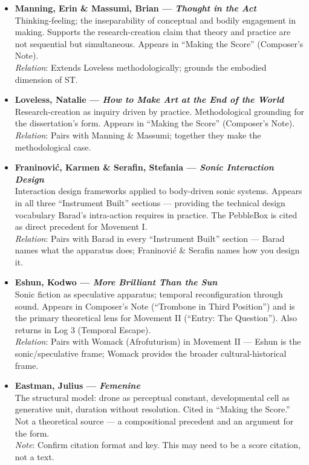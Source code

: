 \begin{itemize}

    \item \textbf{Manning, Erin \& Massumi, Brian — \textit{Thought in the Act}} \parencite{Manning_Massumi_2014}\\
    Thinking-feeling; the inseparability of conceptual and bodily engagement in making. Supports the research-creation claim that theory and practice are not sequential but simultaneous. Appears in ``Making the Score'' (Composer's Note).\\
    \textit{Relation}: Extends Loveless methodologically; grounds the embodied dimension of ST.

    \item \textbf{Loveless, Natalie — \textit{How to Make Art at the End of the World}} \parencite{Loveless_2019}\\
    Research-creation as inquiry driven by practice. Methodological grounding for the dissertation's form. Appears in ``Making the Score'' (Composer's Note).\\
    \textit{Relation}: Pairs with Manning \& Massumi; together they make the methodological case.

    \item \textbf{Franinović, Karmen \& Serafin, Stefania — \textit{Sonic Interaction Design}} \parencite{Franinovic_Serafin_2013}\\
    Interaction design frameworks applied to body-driven sonic systems. Appears in all three ``Instrument Built'' sections — providing the technical design vocabulary Barad's intra-action requires in practice. The PebbleBox is cited as direct precedent for Movement I.\\
    \textit{Relation}: Pairs with Barad in every ``Instrument Built'' section — Barad names what the apparatus does; Franinović \& Serafin names how you design it.

    \item \textbf{Eshun, Kodwo — \textit{More Brilliant Than the Sun}} \parencite{Eshun_1999}\\
    Sonic fiction as speculative apparatus; temporal reconfiguration through sound. Appears in Composer's Note (``Trombone in Third Position'') and is the primary theoretical lens for Movement II (``Entry: The Question''). Also returns in Log 3 (Temporal Escape).\\
    \textit{Relation}: Pairs with Womack (Afrofuturism) in Movement II — Eshun is the sonic/speculative frame; Womack provides the broader cultural-historical frame.

    \item \textbf{Eastman, Julius — \textit{Femenine}}\\
    The structural model: drone as perceptual constant, developmental cell as generative unit, duration without resolution. Cited in ``Making the Score.'' Not a theoretical source — a compositional precedent and an argument for the form.\\
    \textit{Note}: Confirm citation format and key. This may need to be a score citation, not a text.

\end{itemize}

